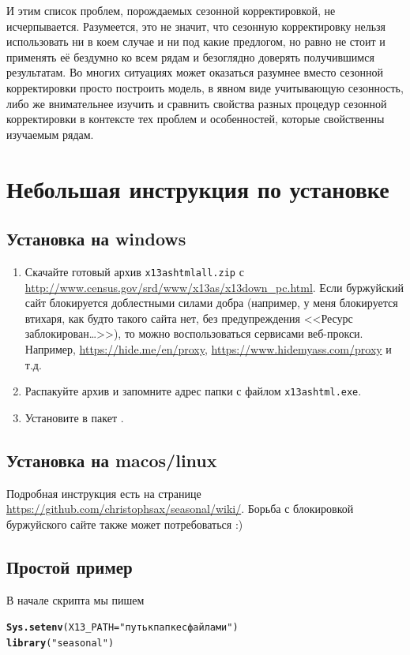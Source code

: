 \documentclass[final,pdftex]{../../template/epsilonj}\usepackage[]{graphicx}\usepackage[]{color}
\makeatletter
\newcommand{\hlstr}[1]{\textcolor[rgb]{0.192,0.494,0.8}{#1}}%
\newcommand{\hlstd}[1]{\textcolor[rgb]{0.345,0.345,0.345}{#1}}%
\newcommand{\hlkwc}[1]{\textcolor[rgb]{0.333,0.667,0.333}{#1}}%
\newcommand{\hlkwd}[1]{\textcolor[rgb]{0.737,0.353,0.396}{\textbf{#1}}}%
\newenvironment{kframe}{%
 \def\at@end@of@kframe{}%
 \ifinner\ifhmode%
  \def\at@end@of@kframe{\end{minipage}}%
  \begin{minipage}{\columnwidth}%
 \fi\fi%
 \def\FrameCommand##1{\hskip\@totalleftmargin \hskip-\fboxsep
 \colorbox{shadecolor}{##1}\hskip-\fboxsep
     \hskip-\linewidth \hskip-\@totalleftmargin \hskip\columnwidth}%
 \MakeFramed {\advance\hsize-\width
   \@totalleftmargin\z@ \linewidth\hsize
   \@setminipage}}%
 {\par\unskip\endMakeFramed%
 \at@end@of@kframe}
\newenvironment{knitrout}{}{} %
\makeatother
\begin{document}
И этим список проблем, порождаемых сезонной корректировкой, не исчерпывается. Разумеется, это не значит, что сезонную корректировку нельзя использовать ни в коем случае и ни под какие предлогом, но равно не стоит и применять её бездумно ко всем рядам и безоглядно доверять получившимся результатам. Во многих ситуациях может оказаться разумнее вместо сезонной корректировки просто построить модель, в явном виде учитывающую сезонность, либо же внимательнее изучить и сравнить свойства разных процедур сезонной корректировки в контексте тех проблем и особенностей, которые свойственны изучаемым рядам. 

\section{Небольшая инструкция по установке}


\subsection{Установка на windows}

\begin{enumerate}
\item Скачайте готовый архив \verb|x13ashtmlall.zip| с \url{http://www.census.gov/srd/www/x13as/x13down_pc.html}. Если буржуйский сайт блокируется доблестными силами добра (например, у меня блокируется втихаря, как будто такого сайта нет, без предупреждения <<Ресурс заблокирован\ldots>>), то можно воспользоваться сервисами веб-прокси. Например, \url{https://hide.me/en/proxy}, \url{https://www.hidemyass.com/proxy} и т.д.
\item Распакуйте архив и запомните адрес папки с файлом \verb|x13ashtml.exe|.
\item Установите в   пакет .
\end{enumerate}

\subsection{Установка на macos/linux}

Подробная инструкция есть на странице \url{https://github.com/christophsax/seasonal/wiki/}. Борьба с блокировкой буржуйского сайте также может потребоваться :)


\subsection{Простой пример}
В начале скрипта   мы пишем
\begin{knitrout}
\color{fgcolor}\begin{kframe}
\begin{alltt}
\hlkwd{Sys.setenv}\hlstd{(}\hlkwc{X13_PATH} \hlstd{=}\hlstr{"путь к папке с файлами"}\hlstd{)}
\hlkwd{library}\hlstd{(}\hlstr{"seasonal"}\hlstd{)}
\end{alltt}
\end{kframe}
\end{knitrout}
\end{document}
